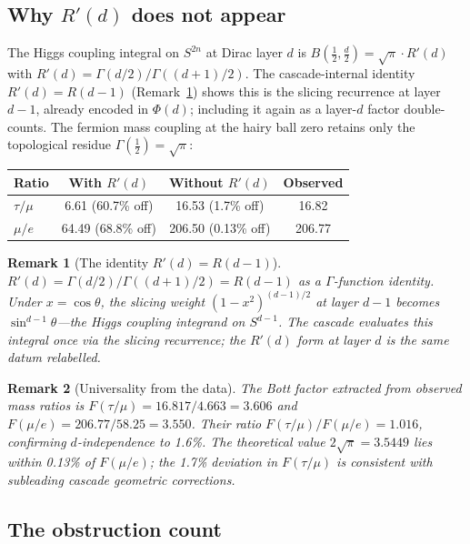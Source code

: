 \documentclass[12pt,a4paper]{article}
\newtheorem*{remark}{Remark}
\begin{document}
\subsection{Why \texorpdfstring{$R'(d)$}{R'(d)} does not appear}

The Higgs coupling integral on $S^{2n}$ at Dirac layer $d$ is $B(\tfrac{1}{2}, \tfrac{d}{2}) = \sqrt{\pi}\cdot R'(d)$ with $R'(d) = \Gamma(d/2)/\Gamma((d+1)/2)$. The cascade-internal identity $R'(d) = R(d-1)$ (Remark~\ref{rem:R-prime-identity}) shows this is the slicing recurrence at layer $d-1$, already encoded in $\Phi(d)$; including it again as a layer-$d$ factor double-counts. The fermion mass coupling at the hairy ball zero retains only the topological residue $\Gamma(\tfrac{1}{2}) = \sqrt{\pi}$:

\begin{center}
\begin{tabular}{lccc}
\hline
Ratio & With $R'(d)$ & Without $R'(d)$ & Observed \\
\hline
$\tau/\mu$ & 6.61 (60.7\% off) & 16.53 (1.7\% off) & 16.82 \\
$\mu/e$ & 64.49 (68.8\% off) & 206.50 (0.13\% off) & 206.77 \\
\hline
\end{tabular}
\end{center}

\begin{remark}[The identity $R'(d) = R(d-1)$]\label{rem:R-prime-identity}
$R'(d) = \Gamma(d/2)/\Gamma((d+1)/2) = R(d-1)$ as a $\Gamma$-function identity. Under $x = \cos\theta$, the slicing weight $(1 - x^2)^{(d-1)/2}$ at layer $d-1$ becomes $\sin^{d-1}\theta$---the Higgs coupling integrand on $S^{d-1}$. The cascade evaluates this integral once via the slicing recurrence; the $R'(d)$ form at layer $d$ is the same datum relabelled.
\end{remark}

\begin{remark}[Universality from the data]\label{rem:universality}
The Bott factor extracted from observed mass ratios is $F(\tau/\mu) = 16.817/4.663 = 3.606$ and $F(\mu/e) = 206.77/58.25 = 3.550$. Their ratio $F(\tau/\mu)/F(\mu/e) = 1.016$, confirming $d$-independence to 1.6\%. The theoretical value $2\sqrt{\pi} = 3.5449$ lies within 0.13\% of $F(\mu/e)$; the 1.7\% deviation in $F(\tau/\mu)$ is consistent with subleading cascade geometric corrections.
\end{remark}

\subsection{The obstruction count}
\end{document}

